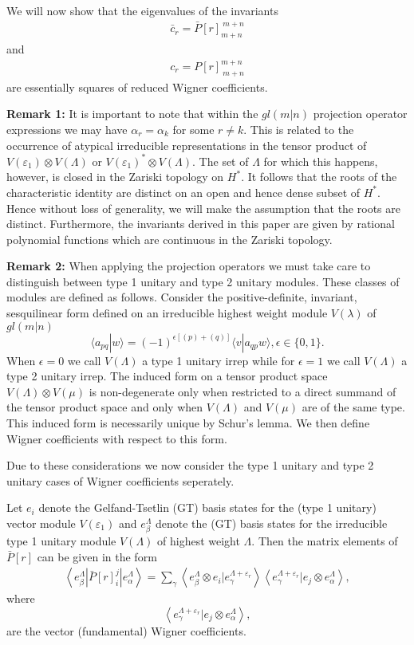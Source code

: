 \documentclass[12pt]{article}
\begin{document}
We will now show that the eigenvalues of the invariants 
\begin{align*}
\bar{c}_r = \bar{P}[r]_{m+n}^{\ m+n}
\end{align*}
and 
\begin{align*}
c_r = P[r]_{\ m+n}^{m+n}
\end{align*}
are essentially squares of reduced Wigner coefficients. 

{\bf Remark 1:} 
It is important to note that within the $gl(m|n)$ projection operator expressions we may have $\alpha_r = \alpha_k$ for some $r \neq k$. This is related to the occurrence of atypical irreducible representations in the tensor product
of $V({\varepsilon_1})\otimes V(\Lambda)$ or $V({\varepsilon_1})^*\otimes V(\Lambda)$. The
set of $\Lambda$ for which this happens, however, is closed in the Zariski topology
\cite{Hump1972} on $H^*$. It follows that the roots of the characteristic identity are distinct on an open and hence dense subset of
$H^*$. Hence without loss of generality, we will make the assumption that the roots are distinct. Furthermore, the invariants derived in this paper are given by rational
polynomial functions which are continuous in the Zariski topology. 

{\bf Remark 2:} 
When applying the projection operators we must take care to distinguish between type 1 unitary and type 2 unitary modules. These classes of modules are defined as follows. Consider the positive-definite, invariant, sesquilinear form defined on an irreducible highest weight module $V(\lambda)$ of $gl(m|n)$ 
$$
\langle a_{pq} | w \rangle = (-1)^{\epsilon [(p) + (q)]} \langle v | a_{qp} w \rangle , \epsilon  \in \{0,1\}.
$$
When $\epsilon = 0$ we call $V(\Lambda)$ a type 1 unitary irrep while for $\epsilon = 1$ we call $V(\Lambda)$ a type 2 unitary irrep. The induced form on a tensor product space $V(\Lambda) \otimes V(\mu)$ is non-degenerate only when restricted to a direct summand of the tensor product space and only when $ V(\Lambda)$ and $V(\mu)$ are of the same type. This induced form is necessarily unique by Schur's lemma. We then define Wigner coefficients with respect to this form. 

Due to these considerations we now consider the type 1 unitary and type 2 unitary cases of Wigner coefficients seperately.

Let $e_i$ denote the Gelfand-Tsetlin (GT) basis states for the (type 1 unitary) vector module $V(\varepsilon_1)$ and ${e^\Lambda_\beta}$ denote the (GT) basis states for the irreducible type 1 unitary module $V(\Lambda)$ of highest weight $\Lambda$. Then the matrix elements of $\bar{P}[r]$ can be given in the form
\begin{align}
\left\langle e^\Lambda_\beta | \bar{P}[r]^j_i | e^{\Lambda}_\alpha \right\rangle =
\sum_\gamma \left\langle e^\Lambda_\beta \otimes e_i | e^{\Lambda + \varepsilon_r}_\gamma \right\rangle
\left\langle e^{\Lambda+\varepsilon_r}_\gamma | e_j \otimes e^\Lambda_\alpha \right\rangle, \label{BarPij}
\end{align}
where
$$
\left\langle e^{\Lambda+\varepsilon_r}_\gamma | e_j \otimes e^\Lambda_\alpha \right\rangle,
$$
are the vector (fundamental) Wigner coefficients.
\end{document}
